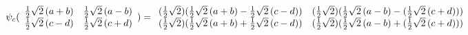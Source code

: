 \documentclass[11pt]{article}
\begin{document}
$\psi _{c}(\allowbreak 
\begin{array}{cc}
\frac{1}{2}\sqrt{2}\left( a+b\right)  & \frac{1}{2}\sqrt{2}\left( a-b\right) 
\\ 
\frac{1}{2}\sqrt{2}\left( c-d\right)  & \frac{1}{2}\sqrt{2}\left( c+d\right) 
\end{array}
\allowbreak )=
\begin{array}{cc}
(\frac{1}{2}\sqrt{2})(\frac{1}{2}\sqrt{2}\left( a+b\right) -\frac{1}{2}\sqrt{%
2}\left( c-d\right) ) & (\frac{1}{2}\sqrt{2})(\frac{1}{2}\sqrt{2}\left(
a-b\right) -(\frac{1}{2}\sqrt{2}\left( c+d\right) )) \\ 
(\frac{1}{2}\sqrt{2})(\frac{1}{2}\sqrt{2}\left( a+b\right) +\frac{1}{2}\sqrt{%
2}\left( c-d\right) ) & (\frac{1}{2}\sqrt{2})(\frac{1}{2}\sqrt{2}\left(
a-b\right) +(\frac{1}{2}\sqrt{2}\left( c+d\right) ))
\end{array}
\allowbreak $
\end{document}
